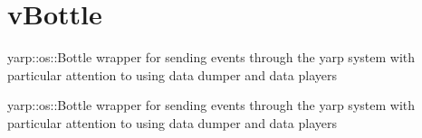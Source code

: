 \hypertarget{group__vBottle}{}\section{v\+Bottle}
\label{group__vBottle}


yarp\+::os\+::\+Bottle wrapper for sending events through the yarp system with particular attention to using data dumper and data players  


yarp\+::os\+::\+Bottle wrapper for sending events through the yarp system with particular attention to using data dumper and data players 

